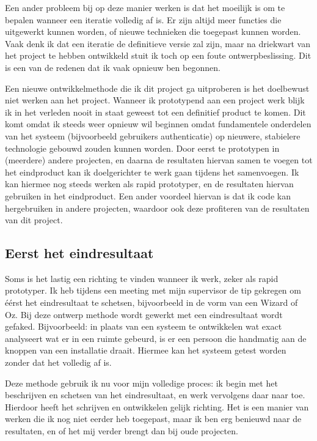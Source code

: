 Een ander probleem bij op deze manier werken is dat het moeilijk is om te bepalen wanneer een iteratie volledig af is. Er zijn altijd meer functies die uitgewerkt kunnen worden, of nieuwe technieken die toegepast kunnen worden. Vaak denk ik dat een iteratie de definitieve versie zal zijn, maar na driekwart van het project te hebben ontwikkeld stuit ik toch op een foute ontwerpbeslissing. Dit is een van de redenen dat ik vaak opnieuw ben begonnen.

Een nieuwe ontwikkelmethode die ik dit project ga uitproberen is het doelbewust niet werken aan het project. Wanneer ik prototypend aan een project werk blijk ik in het verleden nooit in staat geweest tot een definitief product te komen. Dit komt omdat ik steeds weer opnieuw wil beginnen omdat fundamentele onderdelen van het systeem (bijvoorbeeld gebruikers authenticatie) op nieuwere, stabielere technologie gebouwd zouden kunnen worden. Door eerst te prototypen in (meerdere) andere projecten, en daarna de resultaten hiervan samen te voegen tot het eindproduct kan ik doelgerichter te werk gaan tijdens het samenvoegen. Ik kan hiermee nog steeds werken als rapid prototyper, en de resultaten hiervan gebruiken in het eindproduct. Een ander voordeel hiervan is dat ik code kan hergebruiken in andere projecten, waardoor ook deze profiteren van de resultaten van dit project.

\subsection{Eerst het eindresultaat}
Soms is het lastig een richting te vinden wanneer ik werk, zeker als rapid prototyper. Ik heb tijdens een meeting met mijn supervisor de tip gekregen om éérst het eindresultaat te schetsen, bijvoorbeeld in de vorm van een Wizard of Oz. Bij deze ontwerp methode wordt gewerkt met een eindresultaat wordt gefaked. Bijvoorbeeld: in plaats van een systeem te ontwikkelen wat exact analyseert wat er in een ruimte gebeurd, is er een persoon die handmatig aan de knoppen van een installatie draait. Hiermee kan het systeem getest worden zonder dat het volledig af is.

Deze methode gebruik ik nu voor mijn volledige proces: ik begin met het beschrijven en schetsen van het eindresultaat, en werk vervolgens daar naar toe. Hierdoor heeft het schrijven en ontwikkelen gelijk richting. Het is een manier van werken die ik nog niet eerder heb toegepast, maar ik ben erg benieuwd naar de resultaten, en of het mij verder brengt dan bij oude projecten.

